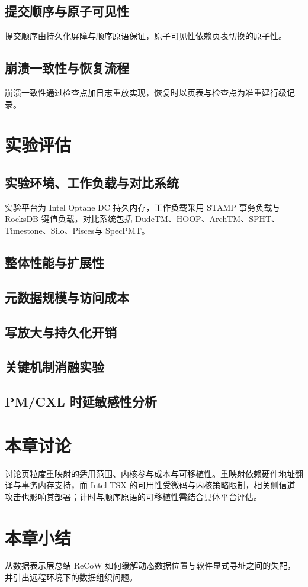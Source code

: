 \subsection{提交顺序与原子可见性}
提交顺序由持久化屏障与顺序原语保证\cite{kashyapScalable2018,chakrabartiAtlas2014}，原子可见性依赖页表切换的原子性。
\subsection{崩溃一致性与恢复流程}
崩溃一致性通过检查点加日志重放实现\cite{correiaRomulus2018,assaTl4x2023,bernsteinConcurrency1987}，恢复时以页表与检查点为准重建行级记录。
\section{实验评估}
\subsection{实验环境、工作负载与对比系统}
实验平台为 Intel Optane DC 持久内存\cite{izraelevitzBasic2019,yangEmpirical2020}，工作负载采用 STAMP 事务负载\cite{minhStamp2008}与 RocksDB 键值负载\cite{caoCharacterizing2020}，对比系统包括 DudeTM\cite{liuDudetm2017}、HOOP\cite{caiHoop2020}、ArchTM\cite{wuArchtm2021}、SPHT\cite{castroSpht2021}、Timestone\cite{krishnanDurable2020}、Silo\cite{zhangSilo2023}、Pisces\cite{guPisces2019}与 SpecPMT\cite{yeSpecpmt2023}。
\subsection{整体性能与扩展性}
\subsection{元数据规模与访问成本}
\subsection{写放大与持久化开销}
\subsection{关键机制消融实验}
\subsection{PM/CXL 时延敏感性分析}
\section{本章讨论}
讨论页粒度重映射的适用范围、内核参与成本与可移植性。重映射依赖硬件地址翻译与事务内存支持，而 Intel TSX 的可用性受微码与内核策略限制\cite{intelTsxAdvisory2019,linuxTsx2019}，相关侧信道攻击也影响其部署\cite{disselkoenPrime2017,jangBreaking2016,canellaFallout2019}；计时与顺序原语的可移植性需结合具体平台评估\cite{cloutierRdtscp2023,kashyapScalable2018}。
\section{本章小结}
从数据表示层总结 ReCoW 如何缓解动态数据位置与软件显式寻址之间的失配，并引出远程环境下的数据组织问题。
